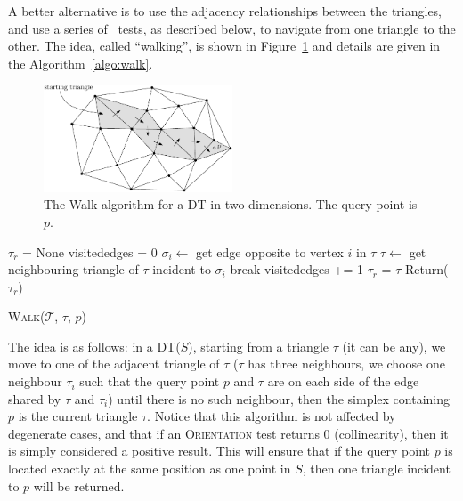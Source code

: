 A better alternative is to use the adjacency relationships between the triangles, and use a series of \Orient\ tests, as described below, to navigate from one triangle to the other. 
The idea, called ``walking'', is shown in Figure~\ref{fig:walk} and details are given in the Algorithm~\ref{algo:walk}.
\begin{figure}
  \centering
  \includegraphics[width=0.5\textwidth]{figs/walk}
  \caption{The Walk algorithm for a DT in two dimensions. The query point is $p$.}
\label{fig:walk}
\end{figure}
\begin{algorithm}[t]
  \DontPrintSemicolon
  \BlankLine  
  $\tau_r$ = None\;
  {
    visitededges = 0\;
    {
      $\sigma_i \leftarrow$ get edge opposite to vertex $i$ in $\tau$\;
      {
        $\tau \leftarrow$ get neighbouring triangle of $\tau$ incident to $\sigma_i$\;
        break\;
      }
      visitededges += 1\;
    }  
    {
      $\tau_r$ = $\tau$\;
    }
  }
  Return($\tau_r$)
  \caption{W\textsc{alk}($\mathcal{T}$, $\tau$, $p$)}
\label{algo:walk}
\end{algorithm}
The idea is as follows: in a DT($S$), starting from a triangle $\tau$ (it can be any), we move to one of the adjacent triangle of $\tau$ ($\tau$ has three neighbours, we choose one neighbour $\tau_i$ such that the query point $p$ and $\tau$ are on each side of the edge shared by $\tau$ and $\tau_i$) until there is no such neighbour, then the simplex containing $p$ is the current triangle $\tau$.
Notice that this algorithm is not affected by degenerate cases, and that if an \textrm{O}\textsc{rientation} test returns 0 (collinearity), then it is simply considered a positive result. 
This will ensure that if the query point $p$ is located exactly at the same position as one point in $S$, then one triangle incident to $p$ will be returned.



